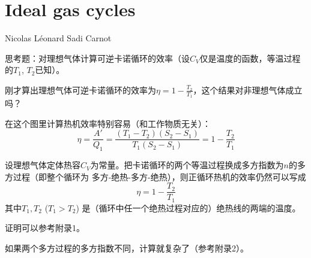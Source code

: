 \documentclass[CJK]{beamer}
\begin{document}
\begin{frame}
\bch
{}
\ech
\end{frame}

\begin{frame}
\bch
{}
\ech
\end{frame}


\section{Ideal gas cycles}



\begin{frame}
\bchL

\emini
{}
\bcenter
Nicolas Léonard Sadi Carnot
\ecenter
\emini
\echL
\end{frame}


\begin{frame}
\bch


\ech
\end{frame}

\begin{frame}
\bchL
{}

思考题：对理想气体计算可逆卡诺循环的效率（设$C_V$仅是温度的函数，等温过程的$T_1$, $T_2$已知）。
\echL
\end{frame}


\begin{frame}
\bchL
刚才算出理想气体可逆卡诺循环的效率为$\eta = 1-\frac{T_2}{T_1}$，这个结果对非理想气体成立吗？
\echL
\end{frame}

\begin{frame}
\bchL
{}

在这个图里计算热机效率特别容易（和工作物质无关）：
$$\eta = \frac{A'}{Q_1} = \frac{(T_1-T_2)(S_2-S_1)}{T_1(S_2-S_1)} = 1- \frac{T_2}{T_1}$$

\echL
\end{frame}


\begin{frame}
\bchL
设理想气体定体热容$C_V$为常量。把卡诺循环的两个等温过程换成多方指数为$n$的多方过程（即整个循环为 多方-绝热-多方-绝热），则正循环热机的效率仍然可以写成
{\blue $$\eta = 1-\frac{T_2}{T_1}$$}
其中$T_1, T_2$ ($T_1>T_2$) 是（循环中任一个绝热过程对应的）绝热线的两端的温度。

\skipline

      {\scriptsize 证明可以参考附录1。

        如果两个多方过程的多方指数不同，计算就复杂了（参考附录2）。}
\echL
\end{frame}
\end{document}
